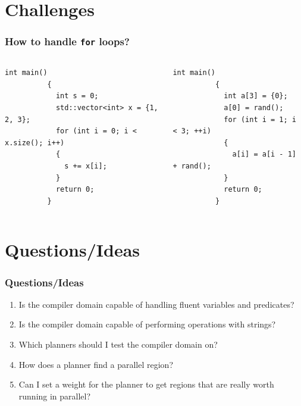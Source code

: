 \documentclass{beamer}
\begin{document}
\section{Challenges}

\begin{frame}[fragile]
  \frametitle{How to handle \texttt{for} loops?}

  \begin{columns}
    \begin{column}{0.5\textwidth}
      \begin{center}
        \begin{lstlisting}[style=cppStyle,basicstyle=\ttfamily\fontsize{7.5pt}{7.5pt}\selectfont]
          int main()
          {
            int s = 0;
            std::vector<int> x = {1, 2, 3};
            for (int i = 0; i < x.size(); i++)
            {
              s += x[i];
            }
            return 0;
          }
        \end{lstlisting}
      \end{center}
    \end{column}
    \begin{column}{0.5\textwidth}
      \begin{center}
        \begin{lstlisting}[style=cppStyle,basicstyle=\ttfamily\fontsize{6.5pt}{7.5pt}\selectfont]
          int main()
          {
            int a[3] = {0};
            a[0] = rand();
            for (int i = 1; i < 3; ++i)
            {
              a[i] = a[i - 1] + rand();
            }
            return 0;
          }
        \end{lstlisting}
      \end{center}
    \end{column}
  \end{columns}
\end{frame}


\section{Questions/Ideas}

\begin{frame}
  \frametitle{Questions/Ideas}

  \begin{enumerate}
    \item<1-> Is the compiler domain capable of handling fluent variables and predicates?
    \item<2-> Is the compiler domain capable of performing operations with strings?
    \item<3-> Which planners should I test the compiler domain on?
    \item<4-> How does a planner find a parallel region?
    \item<5-> Can I set a weight for the planner to get regions that are really worth running in parallel?
  \end{enumerate}
\end{frame}
\end{document}

